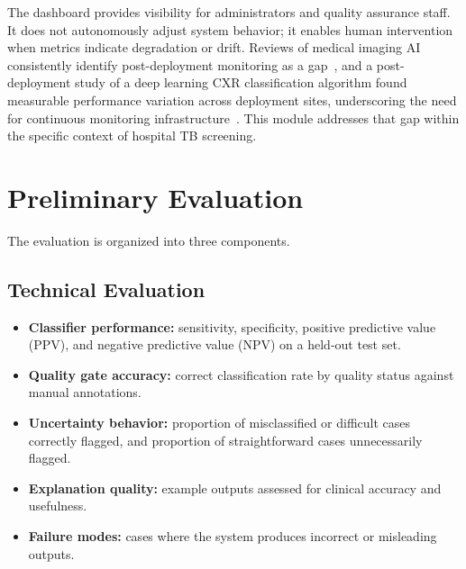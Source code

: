 \documentclass[conference, letterpaper]{IEEEtran}
\begin{document}
The dashboard provides visibility for administrators and quality assurance staff. It does not autonomously adjust system behavior; it enables human intervention when metrics indicate degradation or drift. Reviews of medical imaging AI consistently identify post-deployment monitoring as a gap~\cite{mongan2023review}, and a post-deployment study of a deep learning CXR classification algorithm found measurable performance variation across deployment sites, underscoring the need for continuous monitoring infrastructure~\cite{rudolph2024postdeploy_cxr}. This module addresses that gap within the specific context of hospital TB screening.

\section{Preliminary Evaluation}


The evaluation is organized into three components.

\subsection{Technical Evaluation}

\begin{itemize}
    \item \textbf{Classifier performance:} sensitivity, specificity, positive predictive value (PPV), and negative predictive value (NPV) on a held-out test set.
    \item \textbf{Quality gate accuracy:} correct classification rate by quality status against manual annotations.
    \item \textbf{Uncertainty behavior:} proportion of misclassified or difficult cases correctly flagged, and proportion of straightforward cases unnecessarily flagged.
    \item \textbf{Explanation quality:} example outputs assessed for clinical accuracy and usefulness.
    \item \textbf{Failure modes:} cases where the system produces incorrect or misleading outputs.
\end{itemize}
\end{document}
